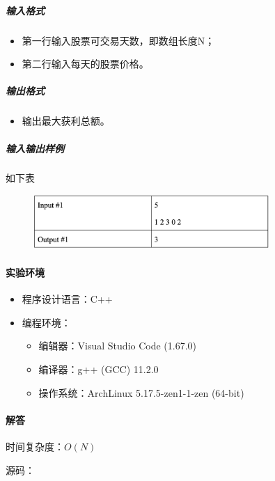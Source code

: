 \documentclass[12pt,a4paper]{ctexart}
\begin{document}
\subparagraph{输入格式}
    \begin{itemize}
        \item 第一行输入股票可交易天数，即数组长度N；
        \item 第二行输入每天的股票价格。
    \end{itemize}

\subparagraph{输出格式}
    \begin{itemize}
        \item 输出最大获利总额。
    \end{itemize}
    
\subparagraph{输入输出样例}
如下表
    \begin{figure}[h]
        \centering
        \includegraphics[width=0.80\textwidth]{q2_iodata.png}
    \end{figure}


\vspace{5pt}

\paragraph{实验环境}
\begin{itemize}
    \item 程序设计语言：C++
    \item 编程环境：
    \begin{itemize}
        \item 编辑器：Visual Studio Code (1.67.0)
        \item 编译器：g++ (GCC) 11.2.0
        \item 操作系统：ArchLinux 5.17.5-zen1-1-zen (64-bit)
    \end{itemize}
\end{itemize}

\vspace{5pt}

\paragraph{解答} 时间复杂度：$O(N)$

源码：
\inputminted[bgcolor=codebg,frame=lines,autogobble,linenos=true,breaklines]{cpp}{src/t2.cpp}

\vspace{5pt}
\end{document}
